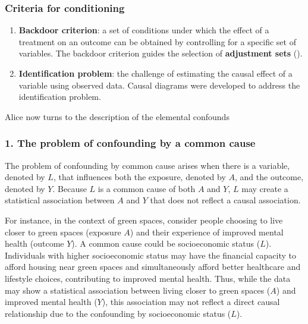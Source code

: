 \documentclass[
  singlecolumn]{article}
\begin{document}
\subsubsection{Criteria for
conditioning}\label{criteria-for-conditioning}

\begin{enumerate}
\def\labelenumi{\arabic{enumi}.}
\setcounter{enumi}{7}
\item
  \textbf{Backdoor criterion}: a set of conditions under which the
  effect of a treatment on an outcome can be obtained by controlling for
  a specific set of variables. The backdoor criterion guides the
  selection of \textbf{adjustment sets} ().
\item
  \textbf{Identification problem}: the challenge of estimating the
  causal effect of a variable using observed data. Causal diagrams were
  developed to address the identification problem.
\end{enumerate}

Alice now turns to the description of the elemental confounds

\subsubsection{1. The problem of confounding by a common
cause}\label{the-problem-of-confounding-by-a-common-cause}

The problem of confounding by common cause arises when there is a
variable, denoted by \(L\), that influences both the exposure, denoted
by \(A\), and the outcome, denoted by \(Y.\) Because \(L\) is a common
cause of both \(A\) and \(Y\), \(L\) may create a statistical
association between \(A\) and \(Y\) that does not reflect a causal
association.

For instance, in the context of green spaces, consider people choosing
to live closer to green spaces (exposure \(A\)) and their experience of
improved mental health (outcome \(Y\)). A common cause could be
socioeconomic status (\(L\)). Individuals with higher socioeconomic
status may have the financial capacity to afford housing near green
spaces and simultaneously afford better healthcare and lifestyle
choices, contributing to improved mental health. Thus, while the data
may show a statistical association between living closer to green spaces
(\(A\)) and improved mental health (\(Y\)), this association may not
reflect a direct causal relationship due to the confounding by
socioeconomic status (\(L\)).
\end{document}

